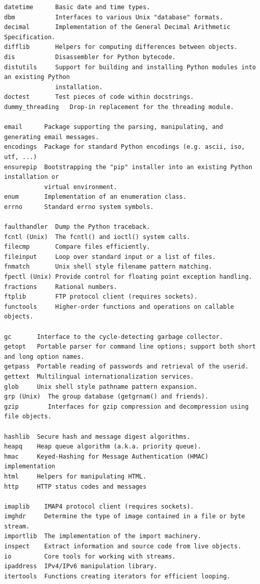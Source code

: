 \documentclass[9pt,a4wide]{extarticle}
\begin{document}
\begin{verbatim}
datetime      Basic date and time types.
dbm           Interfaces to various Unix "database" formats.
decimal       Implementation of the General Decimal Arithmetic Specification.
difflib       Helpers for computing differences between objects.
dis           Disassembler for Python bytecode.
distutils     Support for building and installing Python modules into an existing Python 
              installation.
doctest       Test pieces of code within docstrings.
dummy_threading   Drop-in replacement for the threading module.

email      Package supporting the parsing, manipulating, and generating email messages.
encodings  Package for standard Python encodings (e.g. ascii, iso, utf, ...)
ensurepip  Bootstrapping the "pip" installer into an existing Python installation or 
           virtual environment.
enum       Implementation of an enumeration class.
errno      Standard errno system symbols.

faulthandler  Dump the Python traceback.
fcntl (Unix)  The fcntl() and ioctl() system calls.
filecmp       Compare files efficiently.
fileinput     Loop over standard input or a list of files.
fnmatch       Unix shell style filename pattern matching.
fpectl (Unix) Provide control for floating point exception handling.
fractions     Rational numbers.
ftplib        FTP protocol client (requires sockets).
functools     Higher-order functions and operations on callable objects.

gc       Interface to the cycle-detecting garbage collector.
getopt   Portable parser for command line options; support both short and long option names.
getpass  Portable reading of passwords and retrieval of the userid.
gettext  Multilingual internationalization services.
glob     Unix shell style pathname pattern expansion.
grp (Unix)  The group database (getgrnam() and friends).
gzip        Interfaces for gzip compression and decompression using file objects.

hashlib  Secure hash and message digest algorithms.
heapq    Heap queue algorithm (a.k.a. priority queue).
hmac     Keyed-Hashing for Message Authentication (HMAC) implementation
html     Helpers for manipulating HTML.
http     HTTP status codes and messages

imaplib    IMAP4 protocol client (requires sockets).
imghdr     Determine the type of image contained in a file or byte stream.
importlib  The implementation of the import machinery.
inspect    Extract information and source code from live objects.
io         Core tools for working with streams.
ipaddress  IPv4/IPv6 manipulation library.
itertools  Functions creating iterators for efficient looping.


\end{verbatim}
\end{document}
